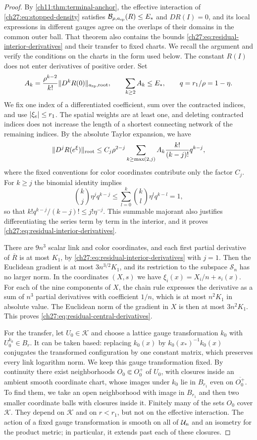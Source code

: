 \begin{proof}
By \cref{ch11:thm:terminal-anchor}, the effective interaction of \eqref{ch27:eq:stopped-density} satisfies $\mathcal B_{\rho,a_{\mathrm{sp}}}(R)\le E_*$ and $DR(I)=0$, and its local expressions in different gauges agree on the overlaps of their domains in the common outer ball. That theorem also contains the bounds \eqref{ch27:eq:residual-interior-derivatives} and their transfer to fixed charts. We recall the argument and verify the conditions on the charts in the form used below. The constant $R(I)$ does not enter derivatives of positive order. Set
\[
 A_k=\frac{\rho^{k-2}}{k!}\lVert D^kR(0)\rVert_{a_{\mathrm{sp}},\mathrm{root}},\qquad\sum_{k\ge2}A_k\le E_*,\qquad q=r_1/\rho=1-\eta.
\]
We fix one index of a differentiated coefficient, sum over the contracted indices, and use $\lvert \xi_e\rvert\le r_1$. The spatial weights are at least one, and deleting contracted indices does not increase the length of a shortest connecting network of the remaining indices. By the absolute Taylor expansion, we have
\[
 \lVert D^jR(e^\xi)\rVert_{\mathrm{root}}\le C_j\rho^{2-j}\sum_{k\ge\max(2,j)}A_k\frac{k!}{(k-j)!}q^{k-j},
\]
where the fixed conventions for color coordinates contribute only the factor $C_j$. For $k\ge j$ the binomial identity implies
\[
 \binom kj\eta^jq^{k-j}\le\sum_{l=0}^k\binom kl\eta^lq^{k-l}=1,
\]
so that $k!q^{k-j}/(k-j)!\le j!\eta^{-j}$. This summable majorant also justifies differentiating the series term by term in the interior, and it proves \eqref{ch27:eq:residual-interior-derivatives}.

There are $9n^3$ scalar link and color coordinates, and each first partial derivative of $\overline R$ is at most $K_1$, by \eqref{ch27:eq:residual-interior-derivatives} with $j=1$. Then the Euclidean gradient is at most $3n^{3/2}K_1$, and its restriction to the subspace $\mathcal S_n$ has no larger norm. In the coordinates $(X,s)$ we have $\xi_i(x)=X_i/n+s_i(x)$. For each of the nine components of $X$, the chain rule expresses the derivative as a sum of $n^3$ partial derivatives with coefficient $1/n$, which is at most $n^2K_1$ in absolute value. The Euclidean norm of the gradient in $X$ is then at most $3n^2K_1$. This proves \eqref{ch27:eq:residual-central-derivatives}.

For the transfer, let $U_0\in\mathcal K$ and choose a lattice gauge transformation $k_0$ with $U_0^{k_0}\in B_r$. It can be taken based: replacing $k_0(x)$ by $k_0(x_*)^{-1}k_0(x)$ conjugates the transformed configuration by one constant matrix, which preserves every link logarithm norm. We keep this gauge transformation fixed. By continuity there exist neighborhoods $O_0\Subset O_0^+$ of $U_0$, with closures inside an ambient smooth coordinate chart, whose images under $k_0$ lie in $B_{r_1}$ even on $\overline{O_0^+}$. To find them, we take an open neighborhood with image in $B_{r_1}$ and then two smaller coordinate balls with closures inside it. Finitely many of the sets $O_0$ cover $\mathcal K$. They depend on $\mathcal K$ and on $r<r_1$, but not on the effective interaction. The action of a fixed gauge transformation is smooth on all of $\mathcal U_{n}$ and an isometry for the product metric; in particular, it extends past each of these closures.


\end{proof}
